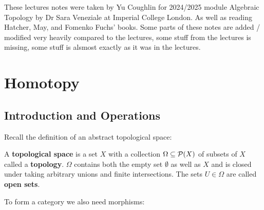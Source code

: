 \documentclass[a4paper]{article}
\begin{document}
\newlength{\edgelentgh}
\setlength{\edgelentgh}{3cm}

\renewcommand*\thesection{\arabic{section}}

These lectures notes were taken by Yu Coughlin for 2024/2025 module Algebraic Topology by Dr Sara Veneziale at Imperial College London. As well as reading Hatcher, May, and Fomenko Fuchs' books. Some parts of these notes are added / modified very heavily compared to the lectures, some stuff from the lectures is missing, some stuff is alsmost exactly as it was in the lectures.
\section{Homotopy}

\subsection{Introduction and Operations}

Recall the definition of an abstract topological space:

\begin{definition}
    A \textbf{topological space} is a set $X$ with a collection $\Omega\subseteq\mathcal{P}(X)$ of subsets of $X$ called a \textbf{topology}. $\Omega$ contains both the empty set $\emptyset$ as well as $X$ and is closed under taking arbitrary unions and finite intersections. The sets $U\in\Omega$ are called \textbf{open sets}.
\end{definition}
To form a category we also need morphisms:
\end{document}
